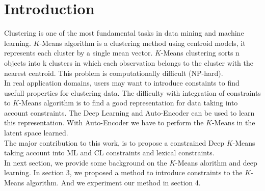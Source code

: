
\section{Introduction}\label{sec:intro}

Clustering is one of the most fundamental tasks in data mining and machine
learning. $K$-Means algorithm is a clustering method using centroid models,
it represents each cluster by a single mean vector. $K$-Means clustering sorts
n objects into k clusters in which each observation belongs to
the cluster with the nearest centroid. This problem is computationally
difficult (NP-hard).
\\In real application domains, users may want to introduce constaints to find
usefull properties for clustering data. The difficulty with integration of
constraints to $K$-Means algorithm  is to find a good representation for data
taking into account constraints. The Deep Learning and Auto-Encoder can be used to
learn this representation. With Auto-Encoder we have to perform the $K$-Means in
the latent space learned.
\\The major contribution to this work, is to propose a constrained Deep $K$-Means
taking account into ML and CL constraints and lexical constraints.
\\In next section, we provide some background on the $K$-Means alorithm and deep
learning. In section 3, we proposed a method to introduce constraints to the
$K$-Means algorithm. And we experiment our method in section 4.  
